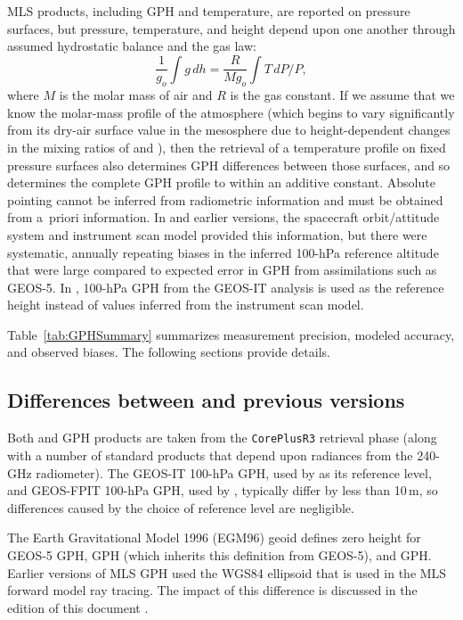 MLS products, including GPH and temperature, are reported on pressure surfaces, but pressure, temperature, and height depend upon one another through assumed hydrostatic balance and the gas law:
\begin{equation}
  \frac{1}{g_o} \int g\,dh = \frac{R}{M g_o}\int T\,dP/P,
  \label{eq:GPHhydrostatic}
\end{equation}
where $M$ is the molar mass of air and $R$ is the gas constant.  If we assume that we know the molar-mass profile of the atmosphere (which begins to vary significantly from its dry-air surface value in the mesosphere due to height-dependent changes in the mixing ratios of  and ), then the retrieval of a temperature profile on fixed pressure surfaces also determines GPH differences between those surfaces, and so determines the complete GPH profile to within an additive constant. Absolute pointing cannot be inferred from radiometric information and must be obtained from a~priori information. In \viv and earlier versions, the spacecraft orbit/attitude system and instrument scan model provided this information, but there were systematic, annually repeating biases in the inferred \mbox{100-hPa} reference altitude that were large compared to expected error in GPH from assimilations such as \mbox{GEOS-5}.  In \thisv, \mbox{100-hPa} GPH from the \mbox{GEOS-IT} analysis is used as the reference height instead of values inferred from the instrument scan model.

Table~\ref{tab:GPHSummary} summarizes \thisv measurement precision, modeled accuracy, and observed biases. The following sections provide details.

\subsection{Differences between \thisv and previous versions}
Both \thisv and \prevv GPH products are taken from the \texttt{CorePlusR3} retrieval phase (along with a number of standard products that depend upon radiances from the 240\nobreakdash-GHz radiometer). The \mbox{GEOS-IT} \mbox{100-hPa} GPH, used by \thisv as its reference level, and \mbox{GEOS-FPIT} \mbox{100-hPa} GPH, used by \prevv, typically differ by less than 10\,m, so differences caused by the choice of reference level are negligible. 

The Earth Gravitational Model 1996 (EGM96) geoid defines zero height for \mbox{GEOS-5} GPH, \thisv GPH (which inherits this definition from \mbox{GEOS-5}), and \prevv GPH\@. Earlier versions of MLS GPH used the WGS84 ellipsoid that is used in the MLS forward model ray tracing. The impact of this difference is discussed in the \viv edition of this document \citep{EOSMLSV4Quality}.

